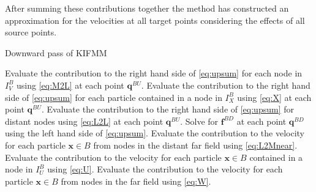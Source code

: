 After summing these contributions together the method has constructed an approximation for the velocities at all target points considering the effects of all source points.


\begin{algorithm}
\caption{Downward pass of KIFMM}\label{alg:DownKIFMM}
\begin{algorithmic}
\State Evaluate the contribution to the right hand side of \cref{eq:upsum} for each node in $I_V^B$ 
\State \quad using \cref{eq:M2L} at each point $\bm{q}^{BU}$.
\State Evaluate the contribution to the right hand side of \cref{eq:upsum} for each particle 
\State \quad contained in a node in $I_X^B$ using \cref{eq:X} at each point $\bm{q}^{BU}$.
\State Evaluate the contribution to the right hand side of \cref{eq:upsum} for distant nodes 
\State \quad using \cref{eq:L2L} at each point $\bm{q}^{BU}$.
\State Solve for $\bm{f}^{BD}$ at each point $\bm{q}^{BD}$ using the left hand side of \cref{eq:upsum}.
\EndFor
{}
\State Evaluate the contribution to the velocity for each particle $\bm{x}\in B$ from nodes in  
\State \quad the distant far field using \cref{eq:L2Mnear}.
\State Evaluate the contribution to the velocity for each particle $\bm{x}\in B$ contained in a 
\State \quad node in $I_U^B$ using \cref{eq:U}.
\State Evaluate the contribution to the velocity for each particle $\bm{x}\in B$  from nodes in  
\State \quad the far field using \cref{eq:W}.
\EndFor
\end{algorithmic}
\end{algorithm}

